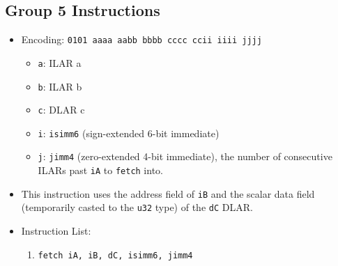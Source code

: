 \documentclass{article}
\begin{document}
	\subsection{Group 5 Instructions}
		\begin{itemize}
		\item Encoding:  \texttt{0101 aaaa aabb bbbb  cccc ccii iiii jjjj}
			\begin{itemize}
			\item \texttt{a}:  ILAR a
			\item \texttt{b}:  ILAR b
			\item \texttt{c}:  DLAR c
			\item \texttt{i}:  \texttt{isimm6} (sign-extended 6-bit
			immediate)
			\item \texttt{j}:  \texttt{jimm4} (zero-extended 4-bit
			immediate), the number of consecutive ILARs past \texttt{iA} to
			\texttt{fetch} into.
			\end{itemize}

		\item This instruction uses the address field of \texttt{iB} and
		the scalar data field (temporarily casted to the \texttt{u32} type)
		of the \texttt{dC} DLAR.

		\item Instruction List:
			\begin{enumerate}
			\item \texttt{fetch iA, iB, dC, isimm6, jimm4}
			\end{enumerate}
		\end{itemize}
		\newpage
\end{document}
